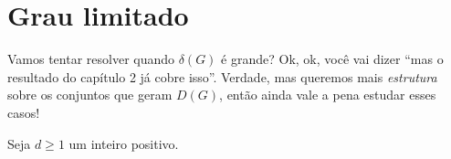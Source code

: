 \chapter{Grau limitado}
\label{cap:grau-limitado}


\newcommand{\drawAndrasfai}[1]{%
  \def\d{#1}                              %
  \pgfmathsetmacro\n{int(3*\d - 1)}       %
  \begin{tikzpicture}[scale=1.5,
    every node/.style={circle, draw, fill=white, inner sep=1pt, font=\small}]
  
  \foreach \i in {0,...,\numexpr \n-1 \relax} {
    \pgfmathsetmacro\angle{90-360*\i/\n}
    \node (v\i) at (\angle:1) {\i};       %
  }

  \foreach \i in {0,...,\numexpr \n-1 \relax} {
    \foreach \offset in {0,...,\numexpr \d-1 \relax} {
      \pgfmathsetmacro\j{mod(\i + \d + \offset, \n)} %
      \pgfmathtruncatemacro{\ii}{\i}
      \pgfmathtruncatemacro{\jj}{\j}
      \ifnum\ii<\jj
        \draw (v\ii) -- (v\jj);          %
      \fi
    }
  }

  \end{tikzpicture}
}


\newcommand{\homarrow}{\xhookrightarrow{\text{hom}}}

Vamos tentar resolver quando $\delta(G)$ é grande?
Ok, ok, você vai dizer ``mas o resultado do capítulo 2 já cobre isso''.
Verdade, mas queremos mais \textit{estrutura} sobre os conjuntos que geram $D(G)$, então ainda vale a pena estudar esses casos!

Seja $d \geq 1$ um inteiro positivo.

